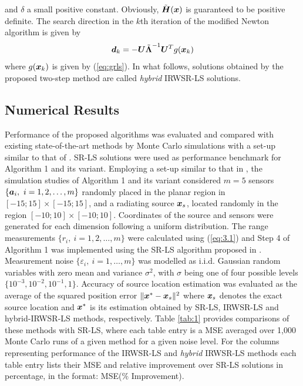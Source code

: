 and $\delta$ a small positive constant. Obviously, $\tilde{\mbox{\boldmath$H$}}(\mbox{\boldmath$x$})$ is guaranteed to be positive definite. The search direction in the $k$th iteration of the modified Newton algorithm is given by 
\begin{equation}
\nonumber
\mbox{\boldmath$d$}_k = - \mbox{\boldmath$U$}\tilde{\mbox{\boldmath{$\Lambda$}}}^{-1}\mbox{\boldmath$U$}^T g(\mbox{\boldmath$x$}_k)
\end{equation}
where $g(\mbox{\boldmath$x$}_k)$ is given by (\ref{eq:grls}). In what follows, solutions obtained by the proposed two-step method are called \textit{hybrid} IRWSR-LS solutions.

\subsection{Numerical Results}


Performance of the proposed algorithms was evaluated and compared with existing state-of-the-art methods by Monte Carlo simulations with a set-up similar to that of \cite{BeckStLi}. SR-LS solutions were used as performance benchmark for Algorithm 1 and its variant. Employing a set-up similar to that in \cite{BeckStLi}, the simulation studies of Algorithm 1 and its variant considered $m = 5$ sensors $\{\mbox{\boldmath$a$}_i, \ i=1, 2,\ldots,m\}$ randomly placed in the planar region in $[-15;15]\times[-15;15]$,
 and a radiating source $\mbox{\boldmath$x$}_s$, located randomly in the region $[-10;10]\times[-10;10]$. Coordinates of the source and sensors were generated for each dimension following a uniform distribution. The range measurements $\{r_i, \ i=1, 2,\ldots, m\}$ were calculated using (\ref{eq:3.1}) and Step 4 of Algorithm 1 was implemented using the SR-LS algorithm proposed in \cite{BeckStLi}. Measurement noise $\{\varepsilon_i, \ i=1,\ldots, m\}$ was modelled as i.i.d. Gaussian random variables with zero mean and variance $\sigma^2$, with $\sigma$ being one of four possible levels $\{10^{-3}, 10^{-2}, 10^{-1}, 1\}$. Accuracy of source location estimation was evaluated as the average of the squared position error $\|\mbox{\boldmath$x$}^* - \mbox{\boldmath$x$}_s\|^2$ where $\mbox{\boldmath$x$}_s$ denotes the exact source location and $\mbox{\boldmath$x$}^*$ is its estimation obtained by SR-LS, IRWSR-LS and hybrid-IRWSR-LS methods, respectively. Table \ref{tab:1} provides comparisons of these methods with SR-LS, where each table entry is a MSE averaged over 1,000 Monte Carlo runs of a given method for a given noise level. For the columns representing performance of the IRWSR-LS and \textit{hybrid} IRWSR-LS methods each table entry lists their MSE and relative improvement over SR-LS solutions in percentage, in the format: MSE($\%$ Improvement). 

